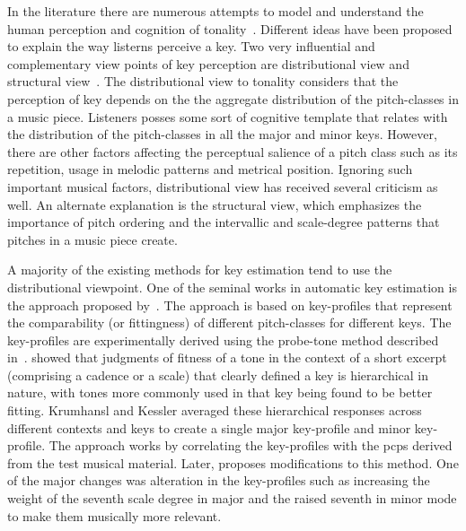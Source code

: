 {In the literature there are numerous attempts to model and understand the human perception and cognition of tonality~\cite{longuet1971interpreting,krumhansl1979quantification,chew2000towards,krumhansl2000tonality,cohen1991tonality}. Different ideas have been proposed to explain the way listerns perceive a key. Two very influential and complementary view points of key perception are distributional view and structural view~\cite{Brown1988,temperley2008pitch}.  The distributional view to tonality considers that the perception of key depends on the the aggregate distribution of the pitch-classes in a music piece. Listeners posses some sort of cognitive template that relates with the distribution of the pitch-classes in all the major and minor keys. However, there are other factors affecting the perceptual salience of a pitch class such as its repetition, usage in melodic patterns and metrical position. Ignoring such important musical factors, distributional view has received several criticism as well. An alternate explanation is the structural view, which emphasizes the importance of pitch ordering and the intervallic and scale-degree patterns that pitches in a music piece create.

A majority of the existing methods for key estimation tend to use the distributional viewpoint. One of the seminal works in automatic key estimation is the approach proposed by~\cite{KrumhanslKessler82,krumhansl2001cognitive}. The approach is based on key-profiles that represent the comparability (or fittingness) of different pitch-classes for different keys. The key-profiles are experimentally derived using the probe-tone method described in~\cite{krumhansl1979quantification}. \cite{krumhansl1979quantification} showed that judgments of fitness of a tone in the context of a short excerpt (comprising a cadence or a scale) that clearly defined a key is hierarchical in nature, with tones more commonly used in that key being found to be better fitting. Krumhansl and Kessler averaged these hierarchical responses across different contexts and keys to create a single
major key-profile and minor key-profile. The approach works by correlating the key-profiles with the \glspl{pcp} derived from the test musical material. Later, \cite{temperley1999s} proposes modifications to this method. One of the major changes was alteration in the key-profiles such as increasing the weight of the seventh scale degree in major and the raised seventh in minor mode to make them musically more relevant. 

}

